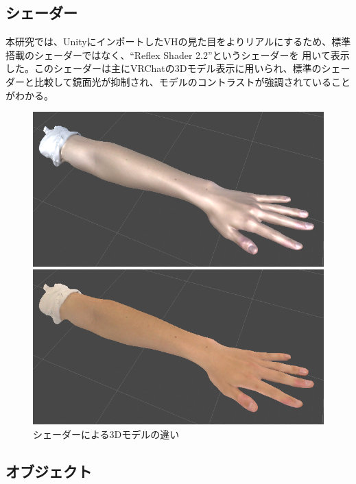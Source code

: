 \documentclass{ltjsreport}
\begin{document}
		\subsection{シェーダー}
			本研究では、UnityにインポートしたVHの見た目をよりリアルにするため、標準搭載のシェーダーではなく、``Reflex Shader 2.2''というシェーダーを
			用いて表示した。このシェーダーは主にVRChatの3Dモデル表示に用いられ、標準のシェーダーと比較して鏡面光が抑制され、モデルのコントラストが強調されていることがわかる。
			\begin{figure}[H]
			\centering
			\begin{minipage}{0.4\columnwidth}
			\centering
			\includegraphics[width = \columnwidth]{../figs/NomalShader.png}
			\end{minipage}
			\hspace{0.04\columnwidth}
			\begin{minipage}{0.4\columnwidth}
			\centering
			\includegraphics[width = \columnwidth]{../figs/ReflexShader.png}
			\end{minipage}
			\caption{シェーダーによる3Dモデルの違い}
			\end{figure}

		\subsection{オブジェクト}
\end{document}
